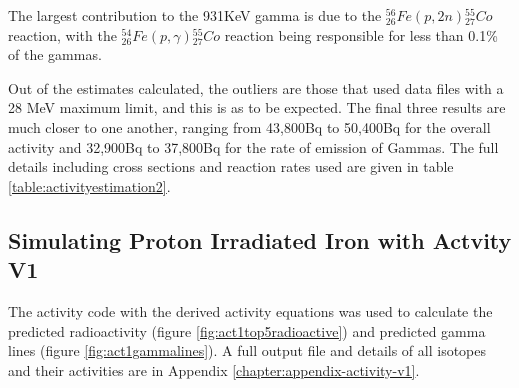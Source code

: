 The largest contribution to the 931KeV gamma is due to the ${}^{56}_{26} Fe (p, 2n) {}^{55}_{27} Co$
reaction, with the ${}^{54}_{26} Fe (p, \gamma) {}^{55}_{27} Co$ reaction being responsible for less than 0.1\% of the gammas.

Out of the estimates calculated, the outliers are those that used data files with a 28 MeV maximum limit, and this is as to be expected.  The final three results are much closer to one another, ranging from 43,800Bq to 50,400Bq for the overall activity and 32,900Bq to 37,800Bq for the rate of emission of Gammas.  The full details including cross sections and reaction rates used are given in table \ref{table:activityestimation2}.


\FloatBarrier


\subsection{Simulating Proton Irradiated Iron with Actvity V1}

The activity code with the derived activity equations was used to calculate the predicted radioactivity (figure \ref{fig:act1top5radioactive}) and predicted gamma lines (figure \ref{fig:act1gammalines}).  A full output file and details of all isotopes and their activities are in Appendix \autoref{chapter:appendix-activity-v1}.

